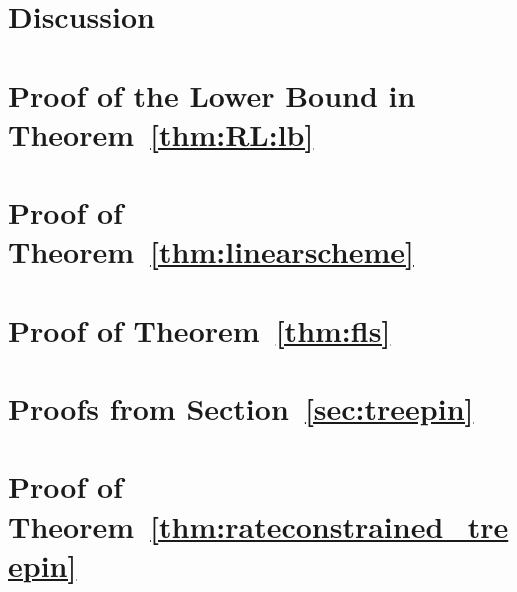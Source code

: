 \documentclass[draftclsnofoot,onecolumn]{IEEEtran}
\begin{document}
\section{Discussion}\label{sec:discussion}


\appendices


 \section{Proof of the Lower Bound in Theorem~\ref{thm:RL:lb}}
\label{app:thm:proof_rl_bound}


\section{Proof of Theorem~\ref{thm:linearscheme}}
\label{app:thm:proof_linearscheme}


\section{Proof of Theorem~\ref{thm:fls}} \label{app:thm:fls}


\section{Proofs from Section~\ref{sec:treepin}} \label{app:thm:cwsk:irred}


\section{Proof of Theorem~\ref{thm:rateconstrained_treepin}} \label{app:thm:proof_rateconstrained_treepin}


% 




\end{document}
